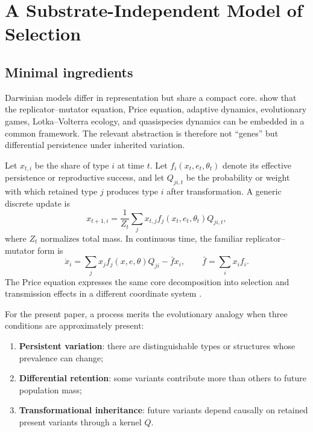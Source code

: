 \documentclass[11pt]{article}
\begin{document}
\section{A Substrate-Independent Model of Selection}

\subsection{Minimal ingredients}

Darwinian models differ in representation but share a compact core. \textcite{page2002} show that the replicator--mutator equation, Price equation, adaptive dynamics, evolutionary games, Lotka--Volterra ecology, and quasispecies dynamics can be embedded in a common framework. The relevant abstraction is therefore not ``genes'' but differential persistence under inherited variation.

Let $x_{t,i}$ be the share of type $i$ at time $t$. Let $f_i(x_t,e_t,\theta_t)$ denote its effective persistence or reproductive success, and let $Q_{ji,t}$ be the probability or weight with which retained type $j$ produces type $i$ after transformation. A generic discrete update is
\begin{equation}
    x_{t+1,i}
    =
    \frac{1}{Z_t}
    \sum_j x_{t,j} f_j(x_t,e_t,\theta_t)Q_{ji,t},
    \label{eq:generic-selection}
\end{equation}
where $Z_t$ normalizes total mass. In continuous time, the familiar replicator--mutator form is
\begin{equation}
    \dot x_i
    =
    \sum_j x_j f_j(x,e,\theta)Q_{ji}
    - \bar f x_i,
    \qquad
    \bar f=\sum_i x_i f_i.
    \label{eq:replicator-mutator}
\end{equation}
The Price equation expresses the same core decomposition into selection and transmission effects in a different coordinate system \parencite{price1970,page2002}.

For the present paper, a process merits the evolutionary analogy when three conditions are approximately present:

\begin{enumerate}[label=(\roman*)]
    \item \textbf{Persistent variation}: there are distinguishable types or structures whose prevalence can change;
    \item \textbf{Differential retention}: some variants contribute more than others to future population mass;
    \item \textbf{Transformational inheritance}: future variants depend causally on retained present variants through a kernel $Q$.
\end{enumerate}
\end{document}
